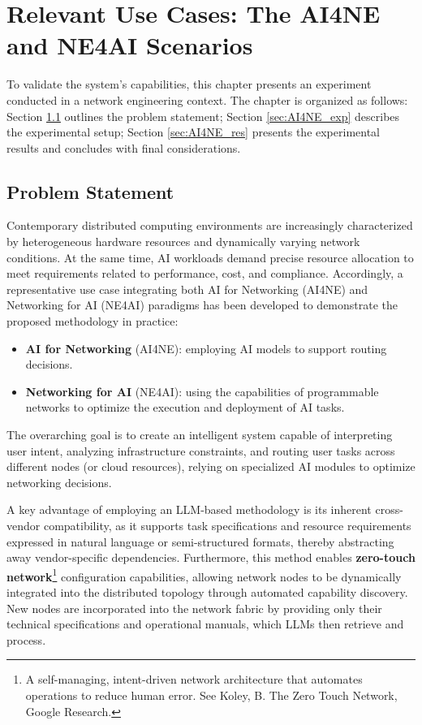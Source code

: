 \chapter{Relevant Use Cases: The AI4NE and NE4AI Scenarios}\label{ch:chapter3}

To validate the system's capabilities, this chapter presents an experiment conducted in a network engineering context. The chapter is organized as follows: Section \ref{sec:AI4NE_statement} outlines the problem statement; Section \ref{sec:AI4NE_exp} describes the experimental setup; Section \ref{sec:AI4NE_res} presents the experimental results and concludes with final considerations.


\section{Problem Statement}\label{sec:AI4NE_statement}

Contemporary distributed computing environments are increasingly characterized by heterogeneous hardware resources and dynamically varying network conditions. At the same time, AI workloads demand precise resource allocation to meet requirements related to performance, cost, and compliance. Accordingly, a representative use case integrating both AI for Networking (AI4NE) and Networking for AI (NE4AI) paradigms has been developed to demonstrate the proposed methodology in practice:

\begin{itemize}[leftmargin=*, label=--]
    \item \textbf{AI for Networking} (AI4NE): employing AI models to support routing decisions.
    \item \textbf{Networking for AI} (NE4AI): using the capabilities of programmable networks to optimize the execution and deployment of AI tasks.
\end{itemize}


The overarching goal is to create an intelligent system capable of interpreting user intent, analyzing infrastructure constraints, and routing user tasks across different nodes (or cloud resources), relying on specialized AI modules to optimize networking decisions.

A key advantage of employing an LLM-based methodology is its inherent cross-vendor compatibility, as it supports task specifications and resource requirements expressed in natural language or semi-structured formats, thereby abstracting away vendor-specific dependencies. Furthermore, this method enables \textbf{zero-touch network}\footnote{A self-managing, intent-driven network architecture that automates operations to reduce human error. See Koley, B. The Zero Touch Network, Google Research.} configuration capabilities, allowing network nodes to be dynamically integrated into the distributed topology through automated capability discovery. New nodes are incorporated into the network fabric by providing only their technical specifications and operational manuals, which LLMs then retrieve and process.


